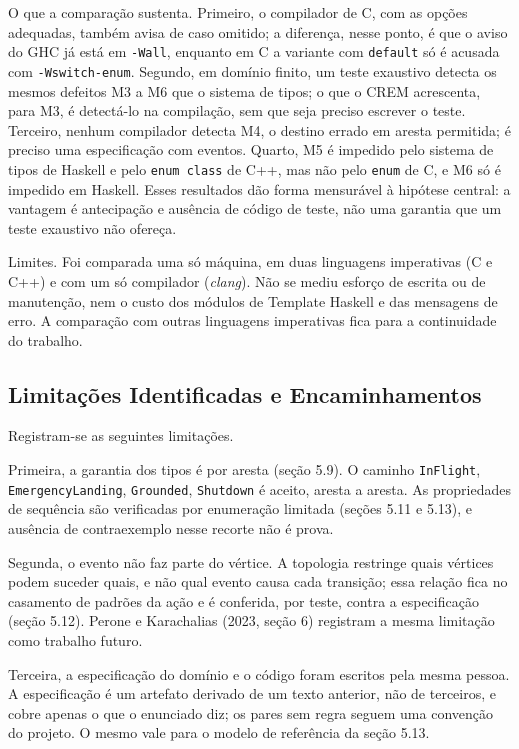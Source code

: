 \documentclass[12pt,a4paper]{article}
\begin{document}
O que a comparação sustenta. Primeiro, o compilador de C, com as opções adequadas, também avisa de caso omitido; a diferença, nesse ponto, é que o aviso do GHC já está em \texttt{-Wall}, enquanto em C a variante com \texttt{default} só é acusada com \texttt{-Wswitch-enum}. Segundo, em domínio finito, um teste exaustivo detecta os mesmos defeitos M3 a M6 que o sistema de tipos; o que o CREM acrescenta, para M3, é detectá-lo na compilação, sem que seja preciso escrever o teste. Terceiro, nenhum compilador detecta M4, o destino errado em aresta permitida; é preciso uma especificação com eventos. Quarto, M5 é impedido pelo sistema de tipos de Haskell e pelo \texttt{enum class} de C++, mas não pelo \texttt{enum} de C, e M6 só é impedido em Haskell. Esses resultados dão forma mensurável à hipótese central: a vantagem é antecipação e ausência de código de teste, não uma garantia que um teste exaustivo não ofereça.

Limites. Foi comparada uma só máquina, em duas linguagens imperativas (C e C++) e com um só compilador (\textit{clang}). Não se mediu esforço de escrita ou de manutenção, nem o custo dos módulos de Template Haskell e das mensagens de erro. A comparação com outras linguagens imperativas fica para a continuidade do trabalho.

\subsection{Limitações Identificadas e Encaminhamentos}

Registram-se as seguintes limitações.

Primeira, a garantia dos tipos é por aresta (seção 5.9). O caminho \texttt{InFlight}, \texttt{EmergencyLanding}, \texttt{Grounded}, \texttt{Shutdown} é aceito, aresta a aresta. As propriedades de sequência são verificadas por enumeração limitada (seções 5.11 e 5.13), e ausência de contraexemplo nesse recorte não é prova.

Segunda, o evento não faz parte do vértice. A topologia restringe quais vértices podem suceder quais, e não qual evento causa cada transição; essa relação fica no casamento de padrões da ação e é conferida, por teste, contra a especificação (seção 5.12). Perone e Karachalias (2023, seção 6) registram a mesma limitação como trabalho futuro.

Terceira, a especificação do domínio e o código foram escritos pela mesma pessoa. A especificação é um artefato derivado de um texto anterior, não de terceiros, e cobre apenas o que o enunciado diz; os pares sem regra seguem uma convenção do projeto. O mesmo vale para o modelo de referência da seção 5.13.
\end{document}
